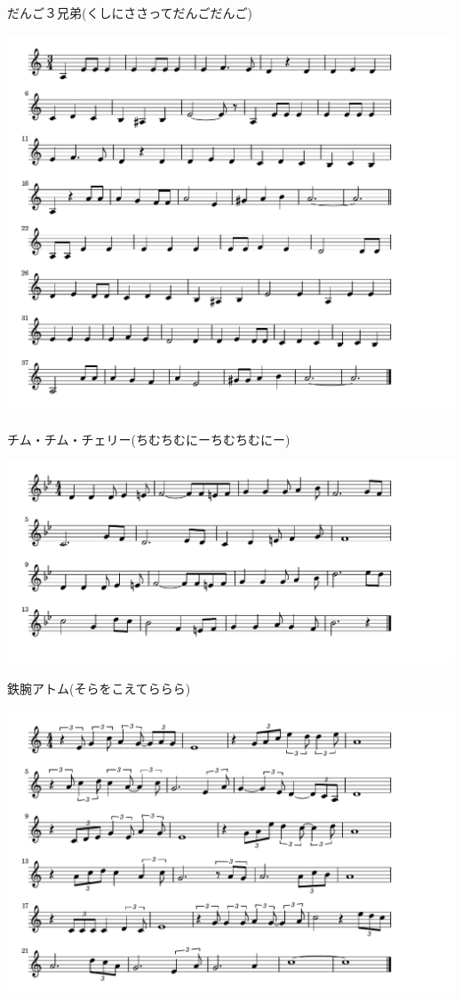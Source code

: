 \documentclass[a4paper]{ltjsarticle}
\begin{document}
\vspace{-10mm} \hspace{10mm}
だんご３兄弟(くしにささってだんごだんご)

\includegraphics[clip]{chimchimcheree_crop.pdf}

\vspace{-10mm} \hspace{10mm}
チム・チム・チェリー(ちむちむにーちむちむにー)

\includegraphics[clip]{tetsuwan_crop.pdf}

\vspace{-10mm} \hspace{10mm}
鉄腕アトム(そらをこえてららら)

\includegraphics[clip]{yogiriyo_crop.pdf}
\end{document}
